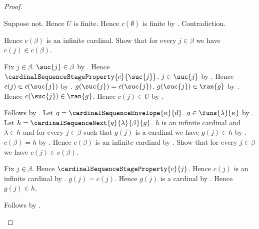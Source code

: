 \begin{proof}
\begin{byCase}
            \begin{subproof}
                Suppose not.
                Hence $U$ is finite.
                Hence $c(\emptyset)$ is finite
                    by .
                Contradiction.
            \end{subproof}
            Hence $c(\beta)$ is an infinite cardinal.
            Show that for every $j\in\beta$ we have $c(j)\in c(\beta)$.
            \begin{subproof}
                Fix $j\in\beta$.
                $\suc{j}\in\beta$ by .
                Hence $\cardinalSequenceStageProperty{c}{\suc{j}}$.
                $j\in\suc{j}$ by .
                Hence $c(j)\in c(\suc{j})$
                    by .
                $g(\suc{j})=c(\suc{j})$.
                $g(\suc{j})\in\ran{g}$ by .
                Hence $c(\suc{j})\in\ran{g}$.
                Hence $c(j)\in U$ by .
            \end{subproof}
            Follows by .
            Let $q=\cardinalSequenceEnvelope{\kappa}{d}$.
            $q\in\funs{\lambda}{\kappa}$
                by .
            Let $h=\cardinalSequenceNext{q}{\lambda}{\beta}{g}$.
            $h$ is an infinite cardinal and $\lambda\in h$ and
                for every $j\in\beta$ such that $g(j)$ is a cardinal
                    we have $g(j)\in h$
                by .
            $c(\beta)=h$ by .
            Hence $c(\beta)$ is an infinite cardinal by \auto.
            Show that for every $j\in\beta$ we have $c(j)\in c(\beta)$.
            \begin{subproof}
                Fix $j\in\beta$.
                Hence $\cardinalSequenceStageProperty{c}{j}$.
                Hence $c(j)$ is an infinite cardinal
                    by .
                $g(j)=c(j)$.
                Hence $g(j)$ is a cardinal by \auto.
                Hence $g(j)\in h$.
            \end{subproof}
            Follows by .
    \end{byCase}
\end{proof}

